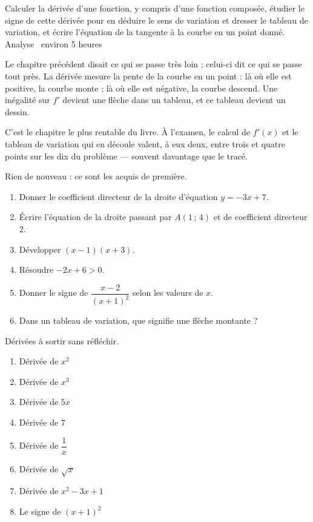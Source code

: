   {Calculer la dérivée d'une fonction, y compris d'une fonction composée,
   étudier le signe de cette dérivée pour en déduire le sens de variation et
   dresser le tableau de variation, et écrire l'équation de la tangente à la
   courbe en un point donné.}
  {Analyse \textbullet\ environ 5 heures}

Le chapitre précédent disait ce qui se passe très loin ; celui-ci dit ce qui
se passe tout près. La dérivée mesure la pente de la courbe en un point : là
où elle est positive, la courbe monte ; là où elle est négative, la courbe
descend. Une inégalité sur $f'$ devient une flèche dans un tableau, et ce
tableau devient un dessin.

C'est le chapitre le plus rentable du livre. À l'examen, le calcul de $f'(x)$
et le tableau de variation qui en découle valent, à eux deux, entre trois et
quatre points sur les dix du problème — souvent davantage que le tracé.

\begin{revision}
Rien de nouveau : ce sont les acquis de première.

\begin{enumerate}[label=\textbf{\arabic*.}, leftmargin=*, itemsep=0.35em]
  \item Donner le coefficient directeur de la droite d'équation
        $y = -3x+7$.
  \item Écrire l'équation de la droite passant par $A(1\,;\,4)$ et de
        coefficient directeur $2$.
  \item Développer $(x-1)(x+3)$.
  \item Résoudre $-2x+6 > 0$.
  \item Donner le signe de $\dfrac{x-2}{(x+1)^{2}}$ selon les valeurs de
        $x$.
  \item Dans un tableau de variation, que signifie une flèche montante ?
\end{enumerate}
\end{revision}

\begin{automatismes}
Dérivées à sortir sans réfléchir.

\begin{enumerate}[label=\textbf{\alph*)}, leftmargin=*, itemsep=0.25em]
  \item Dérivée de $x^{2}$
  \item Dérivée de $x^{3}$
  \item Dérivée de $5x$
  \item Dérivée de $7$
  \item Dérivée de $\dfrac{1}{x}$
  \item Dérivée de $\sqrt{x}$
  \item Dérivée de $x^{2}-3x+1$
  \item Le signe de $(x+1)^{2}$
\end{enumerate}
\end{automatismes}

